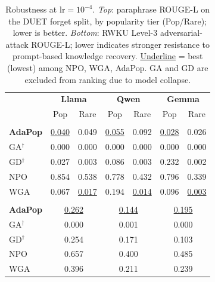 \begin{table}[ht]
\centering
\footnotesize
\setlength{\tabcolsep}{3pt}
\begin{tabularx}{\linewidth}{|>{\raggedright\arraybackslash}X|c|c|c|c|c|c|}
\hline
\multirow{2}{*}{\textbf{Algo}} & \multicolumn{2}{c|}{\textbf{Llama}} & \multicolumn{2}{c|}{\textbf{Qwen}} & \multicolumn{2}{c|}{\textbf{Gemma}} \\
 & Pop & Rare & Pop & Rare & Pop & Rare \\ \hline
\rowcolor{green!15}
\multicolumn{7}{|l|}{\textit{DUET paraphrase forget ROUGE-L $\downarrow$}} \\ \hline
\rowcolor{violet!15}
\textbf{AdaPop} & \underline{0.040} & 0.049 & \underline{0.055} & 0.092 & \underline{0.028} & 0.026 \\ \hline
\rowcolor{gray!10}
GA$^\dag$ & 0.000 & 0.000 & 0.000 & 0.000 & 0.000 & 0.000 \\ \hline
GD$^\dag$ & 0.027 & 0.003 & 0.086 & 0.003 & 0.232 & 0.002 \\ \hline
\rowcolor{gray!10}
NPO    & 0.854 & 0.538 & 0.778 & 0.432 & 0.796 & 0.339 \\ \hline
WGA    & 0.067 & \underline{0.017} & 0.194 & \underline{0.014} & 0.096 & \underline{0.003} \\ \hline
\rowcolor{green!15}
\multicolumn{7}{|l|}{\textit{RWKU Level-3 forget ROUGE-L $\downarrow$}} \\ \hline
\rowcolor{violet!15}
\textbf{AdaPop} & \multicolumn{2}{c|}{\underline{0.262}} & \multicolumn{2}{c|}{\underline{0.144}} & \multicolumn{2}{c|}{\underline{0.195}} \\ \hline
\rowcolor{gray!10}
GA$^\dag$ & \multicolumn{2}{c|}{0.000} & \multicolumn{2}{c|}{0.001} & \multicolumn{2}{c|}{0.000} \\ \hline
GD$^\dag$ & \multicolumn{2}{c|}{0.254} & \multicolumn{2}{c|}{0.171} & \multicolumn{2}{c|}{0.103} \\ \hline
\rowcolor{gray!10}
NPO    & \multicolumn{2}{c|}{0.657} & \multicolumn{2}{c|}{0.400} & \multicolumn{2}{c|}{0.485} \\ \hline
WGA    & \multicolumn{2}{c|}{0.396} & \multicolumn{2}{c|}{0.211} & \multicolumn{2}{c|}{0.239} \\ \hline
\end{tabularx}
\caption{Robustness at $\text{lr}=10^{-4}$. \textit{Top}: paraphrase ROUGE-L on the DUET forget split, by popularity tier (Pop/Rare); lower is better. \textit{Bottom}: RWKU Level-3 adversarial-attack ROUGE-L; lower indicates stronger resistance to prompt-based knowledge recovery. \underline{Underline} = best (lowest) among NPO, WGA, AdaPop. GA and GD are excluded from ranking due to model collapse.}
\label{tab:robustness}
\end{table}


